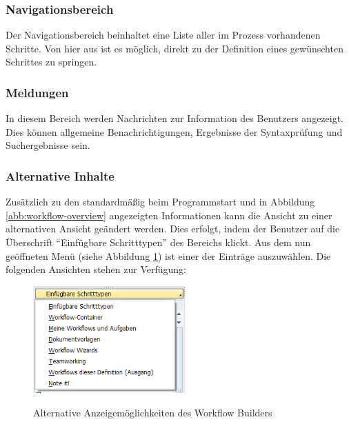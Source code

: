 \subsubsection{Navigationsbereich}
\label{sec:win-overview-information}
Der Navigationsbereich beinhaltet eine Liste aller im Prozess vorhandenen Schritte. Von hier aus ist es möglich, direkt zu der Definition eines gewünschten Schrittes zu springen. 

\subsubsection{Meldungen}
\label{sec:win-overview-meldungen}
In diesem Bereich werden Nachrichten zur Information des Benutzers angezeigt. Dies können allgemeine Benachrichtigungen, Ergebnisse der Syntaxprüfung und Suchergebnisse sein.

\subsubsection{Alternative Inhalte}
\label{sec:win-overview-alternative}
Zusätzlich zu den standardmäßig beim Programmstart und in Abbildung \ref{abb:workflow-overview} angezeigten Informationen kann die Ansicht  zu einer alternativen Ansicht geändert werden. Dies erfolgt, indem der Benutzer auf die Überschrift "`Einfügbare Schritttypen"' des Bereichs klickt. Aus dem nun geöffneten Menü (siehe Abbildung \ref{abb:workflow-alternatives}) ist einer der Einträge auszuwählen. Die folgenden Ansichten stehen zur Verfügung:

\begin{figure}[h]
	\begin{center}
	\includegraphics[width=220px]{grafiken/wf-builder_alternative-inhalte.png}
	\caption{Alternative Anzeigemöglichkeiten des Workflow Builders}
	\vspace{-10pt}
	\label{abb:workflow-alternatives}
	\end{center}
\end{figure}

